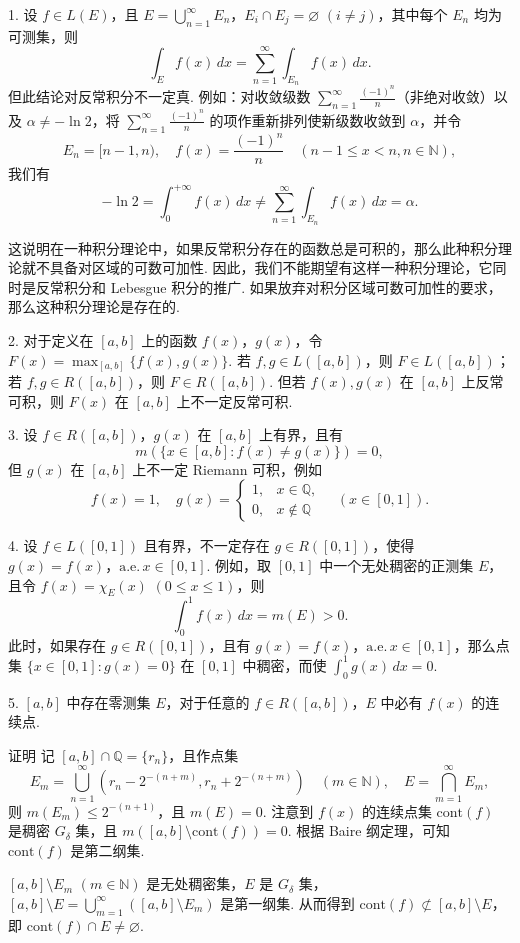 \documentclass[../../main.tex]{subfiles}
\begin{document}
\begin{remark}
1. 设 \( f \in L(E) \)，且 \( E = \bigcup_{n = 1}^{\infty} E_n \)，\( E_i \cap E_j = \varnothing \) \( (i \neq j) \)，其中每个 \( E_n \) 均为可测集，则
\[
\int_E f(x) \, dx = \sum_{n = 1}^{\infty} \int_{E_n} f(x) \, dx.
\]
但此结论对反常积分不一定真. 例如：对收敛级数 \( \sum_{n = 1}^{\infty} \frac{(-1)^n}{n} \)（非绝对收敛）以及 \( \alpha \neq -\ln 2 \)，将 \( \sum_{n = 1}^{\infty} \frac{(-1)^n}{n} \) 的项作重新排列使新级数收敛到 \( \alpha \)，并令
\[
E_n = [n - 1, n), \quad f(x) = \frac{(-1)^n}{n} \quad (n - 1 \leq x < n, n \in \mathbb{N}),
\]
我们有
\[
-\ln 2 = \int_0^{+\infty} f(x) \, dx \neq \sum_{n = 1}^{\infty} \int_{E_n} f(x) \, dx = \alpha.
\]

这说明在一种积分理论中，如果反常积分存在的函数总是可积的，那么此种积分理论就不具备对区域的可数可加性. 因此，我们不能期望有这样一种积分理论，它同时是反常积分和 Lebesgue 积分的推广. 如果放弃对积分区域可数可加性的要求，那么这种积分理论是存在的.

2. 对于定义在 \( [a, b] \) 上的函数 \( f(x) \)，\( g(x) \)，令 \( F(x) = \max_{[a, b]} \{ f(x), g(x) \} \). 若 \( f, g \in L([a, b]) \)，则 \( F \in L([a, b]) \)；若 \( f, g \in R([a, b]) \)，则 \( F \in R([a, b]) \). 但若 \( f(x), g(x) \) 在 \( [a, b] \) 上反常可积，则 \( F(x) \) 在 \( [a, b] \) 上不一定反常可积.

3. 设 \( f \in R([a, b]) \)，\( g(x) \) 在 \( [a, b] \) 上有界，且有
\[
m(\{ x \in [a, b] : f(x) \neq g(x) \}) = 0,
\]
但 \( g(x) \) 在 \( [a, b] \) 上不一定 Riemann 可积，例如
\[
f(x) = 1, \quad g(x) = 
\begin{cases} 
1, & x \in \mathbb{Q}, \\
0, & x \notin \mathbb{Q}
\end{cases} \quad (x \in [0, 1]).
\]

4. 设 \( f \in L([0, 1]) \) 且有界，不一定存在 \( g \in R([0, 1]) \)，使得 \( g(x) = f(x) \)，\(\text{a.e.}\, x \in [0, 1] \). 例如，取 \( [0, 1] \) 中一个无处稠密的正测集 \( E \)，且令 \( f(x) = \chi_E(x) \) \( (0 \leq x \leq 1) \)，则
\[
\int_0^1 f(x) \, dx = m(E) > 0.
\]
此时，如果存在 \( g \in R([0, 1]) \)，且有 \( g(x) = f(x) \)，\(\text{a.e.}\, x \in [0, 1] \)，那么点集 \( \{ x \in [0, 1] : g(x) = 0 \} \) 在 \( [0, 1] \) 中稠密，而使 \( \int_0^1 g(x) \, dx = 0 \).

5. \( [a, b] \) 中存在零测集 \( E \)，对于任意的 \( f \in R([a, b]) \)，\( E \) 中必有 \( f(x) \) 的连续点.

证明 记 \( [a, b] \cap \mathbb{Q} = \{ r_n \} \)，且作点集
\[
E_m = \bigcup_{n = 1}^{\infty} \left( r_n - 2^{-(n + m)}, r_n + 2^{-(n + m)} \right) \quad (m \in \mathbb{N}), \quad E = \bigcap_{m = 1}^{\infty} E_m,
\]
则 \( m(E_m) \leq 2^{-(n + 1)} \)，且 \( m(E) = 0 \). 注意到 \( f(x) \) 的连续点集 \( \mathrm{cont}(f) \) 是稠密 \( G_{\delta} \) 集，且 \( m([a, b] \setminus \mathrm{cont}(f)) = 0 \). 根据 Baire 纲定理，可知 \( \mathrm{cont}(f) \) 是第二纲集.

\( [a, b] \setminus E_m \) \( (m \in \mathbb{N}) \) 是无处稠密集，\( E \) 是 \( G_{\delta} \) 集，\( [a, b] \setminus E = \bigcup_{m = 1}^{\infty} ([a, b] \setminus E_m) \) 是第一纲集. 从而得到 \( \mathrm{cont}(f) \not\subset [a, b] \setminus E \)，即 \( \mathrm{cont}(f) \cap E \neq \varnothing \).
\end{remark}
\end{document}

